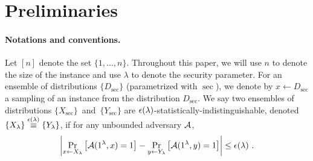 \newcommand{\memsize}{{N}}
\newcommand{\blocksize}{{b}}
\newcommand{\Y}{{\bf Y}}

%
\section{Preliminaries}
\label{sec:defs}

\paragraph{Notations and conventions.}
Let $[n]$ denote the set $\{1,\ldots,n\}$. Throughout this paper, we will use
$n$ to denote the size of the instance and use $\lambda$ to denote the security parameter. 
For an ensemble of distributions $\{D_\sec\}$ (parametrized with $\sec$),
we denote by $x \leftarrow D_\sec$ a sampling of an instance from the distribution $D_\sec$. 
We say two ensembles of distributions $\{X_\sec\}$~and~$\{Y_\sec\}$ 
are ${\epsilon}({\lambda})$-statistically-indistinguishable, denoted $\{X_{\lambda}\} \overset{{\epsilon}({\lambda})}{\equiv} \{Y_{\lambda}\}$, 
if for any unbounded adversary ${\cal A}$, 
\[
\left|\Pr_{x\leftarrow X_{\lambda}}\left[{\cal A}(1^\lambda, x)=1\right] - \Pr_{y\leftarrow Y_{\lambda}}\left[{\cal A}(1^\lambda, y)=1\right] \right| \leq {\epsilon}({\lambda}) \ .
\]



